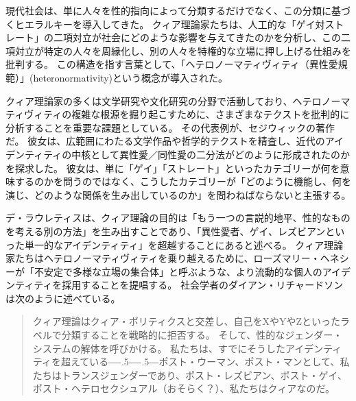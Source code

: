 \documentclass[paper=a4,book,openany]{jlreq}
\newcommand{\ig}[1]{}           %
\def\DDASH{―\kern-.5\zw―\kern-.5\zw―} %
\begin{document}
現代社会は、単に人々を性的指向によって分類するだけでなく、この分類に基づくヒエラルキーを導入してきた。
クィア理論家たちは、人工的な「ゲイ対ストレート」の二項対立が社会にどのような影響を与えてきたのかを分析し、この二項対立が特定の人々を周縁化し、別の人々を特権的な立場に押し上げる仕組みを批判する。
この構造を指す言葉として、「ヘテロノーマティヴィティ（異性愛規範）」(heteronormativity)という概念が導入された\citep{warner91:_introd}。

クィア理論家の多くは文学研究や文化研究の分野で活動しており、ヘテロノーマティヴィティの複雑な根源を掘り起こすために、さまざまなテクストを批判的に分析することを重要な課題としている。
その代表例が、セジウィックの著作だ。
彼女は、広範囲にわたる文学作品や哲学的テクストを精査し、近代のアイデンティティの中核として異性愛／同性愛の二分法がどのように形成されたのかを探求した。
彼女は、単に「ゲイ」「ストレート」といったカテゴリーが何を意味するのかを問うのではなく、こうしたカテゴリーが「どのように機能し、何を演じ、どのような関係を生み出しているのか」を問わねばならないと主張する\citep[p.27]{sedgwick90:_epist_closet}。

デ・ラウレティスは、クィア理論の目的は「もう一つの言説的地平、性的なものを考える別の方法」を生み出すことであり、「異性愛者、ゲイ、レズビアンといった単一的なアイデンティティ」を超越することにあると述べる\citep[p.iv]{lauretis91:_diff}。
クィア理論家たちはヘテロノーマティヴィティを乗り越えるために、ローズマリー・ヘネシーが「不安定で多様な立場の集合体」と呼ぶような、より流動的な個人のアイデンティティを採用することを提唱する\citep[p.965]{hennessy93:_queer_theor}。
社会学者のダイアン・リチャードソン\ig{Diane Richardson}は次のように述べている。

\begin{quote}
クィア理論はクィア・ポリティクスと交差し、自己をXやYやZといったラベルで分類することを戦略的に拒否する。
そして、性的なジェンダー・システムの解体を呼びかける。
私たちは、すでにそうしたアイデンティティを超えている{\DDASH}ポスト・ウーマン、ポスト・マンとして、私たちはトランスジェンダーであり、ポスト・レズビアン、ポスト・ゲイ、ポスト・ヘテロセクシュアル（おそらく？）、私たちはクィアなのだ。
\citep[p.38]{richardson00:_rethin_sexual}
\end{quote}
\end{document}
